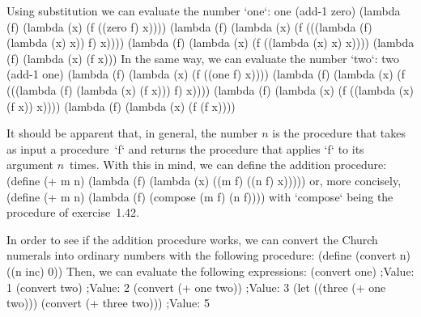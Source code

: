 Using substitution we can evaluate the number `one`:
\begtt\scm
one
(add-1 zero)
(lambda (f) (lambda (x) (f ((zero f) x))))
(lambda (f) (lambda (x) (f (((lambda (f) (lambda (x) x)) f) x))))
(lambda (f) (lambda (x) (f ((lambda (x) x) x))))
(lambda (f) (lambda (x) (f x)))
\endtt
In the same way, we can evaluate the number `two`:
\begtt\scm
two
(add-1 one)
(lambda (f) (lambda (x) (f ((one f) x))))
(lambda (f) (lambda (x) (f (((lambda (f) (lambda (x) (f x))) f) x))))
(lambda (f) (lambda (x) (f ((lambda (x) (f x)) x))))
(lambda (f) (lambda (x) (f (f x))))
\endtt

It should be apparent that, in general, the number $n$ is the procedure that takes as input a procedure~`f` and returns the procedure that applies `f` to its argument $n$~times.
With this in mind, we can define the addition procedure:
\begtt\scm
(define (+ m n)
  (lambda (f) (lambda (x) ((m f) ((n f) x)))))
\endtt
or, more concisely,
\begtt\scm
(define (+ m n)
  (lambda (f) (compose (m f) (n f))))
\endtt
with `compose` being the procedure of exercise~1.42.

In order to see if the addition procedure works, we can convert the Church numerals into ordinary numbers with the following procedure:
\begtt\scm
(define (convert n)
  ((n inc) 0))
\endtt
Then, we can evaluate the following expressions:
\begtt\scm
(convert one)
;Value: 1
(convert two)
;Value: 2
(convert (+ one two))
;Value: 3
(let ((three (+ one two)))
  (convert (+ three two)))
;Value: 5
\endtt
